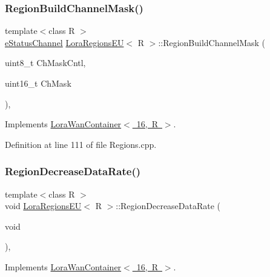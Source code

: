 \subsubsection{\texorpdfstring{Region\+Build\+Channel\+Mask()}{RegionBuildChannelMask()}}
{\footnotesize\ttfamily template$<$class R $>$ \\
\mbox{\hyperlink{_define_8h_abbfbf157098d2505c0cf33877b128cc9}{e\+Status\+Channel}} \mbox{\hyperlink{class_lora_regions_e_u}{Lora\+Regions\+EU}}$<$ R $>$\+::Region\+Build\+Channel\+Mask (\begin{DoxyParamCaption}\item[{uint8\+\_\+t}]{Ch\+Mask\+Cntl,  }\item[{uint16\+\_\+t}]{Ch\+Mask }\end{DoxyParamCaption})\hspace{0.3cm}{\ttfamily [protected]}, {\ttfamily [virtual]}}



Implements \mbox{\hyperlink{class_lora_wan_container_a7f0fbbcc4652885003a1db83aa28e507}{Lora\+Wan\+Container$<$ 16, R $>$}}.



Definition at line 111 of file Regions.\+cpp.

\mbox{\label{class_lora_regions_e_u_ad6bf116000ec083c6e7e0a7f930aa2c6}} 
\subsubsection{\texorpdfstring{Region\+Decrease\+Data\+Rate()}{RegionDecreaseDataRate()}}
{\footnotesize\ttfamily template$<$class R $>$ \\
void \mbox{\hyperlink{class_lora_regions_e_u}{Lora\+Regions\+EU}}$<$ R $>$\+::Region\+Decrease\+Data\+Rate (\begin{DoxyParamCaption}\item[{void}]{ }\end{DoxyParamCaption})\hspace{0.3cm}{\ttfamily [protected]}, {\ttfamily [virtual]}}



Implements \mbox{\hyperlink{class_lora_wan_container_a198e46f5b6358987f6ec0b91fdc8eab9}{Lora\+Wan\+Container$<$ 16, R $>$}}.




